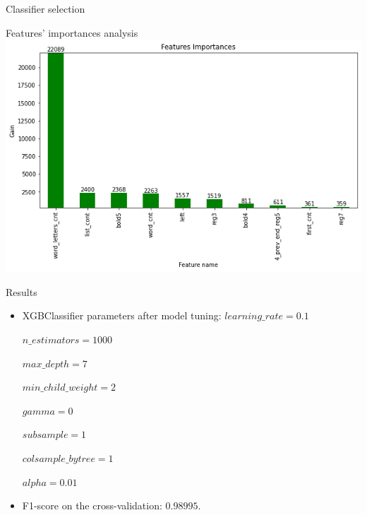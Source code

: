 \documentclass{beamer}
\begin{document}
\begin{frame}{Classifier selection}
\end{frame}

\begin{frame}{Features' importances analysis}
    \includegraphics[width=\textwidth]{pics/gaines.png}
\end{frame}

\begin{frame}{Results}
    \begin{itemize}
        \item XGBClassifier parameters after model tuning:
        $learning\_rate = 0.1$
    
        $n\_estimators = 1000$
        
        $max\_depth = 7$
        
        $min\_child\_weight = 2$
        
        $gamma = 0$
        
        $subsample = 1$
        
        $colsample\_bytree = 1$
        
        $alpha = 0.01$
        \item F1-score on the cross-validation: 
        $0.98995$.
    \end{itemize}
\end{frame}
\end{document}
